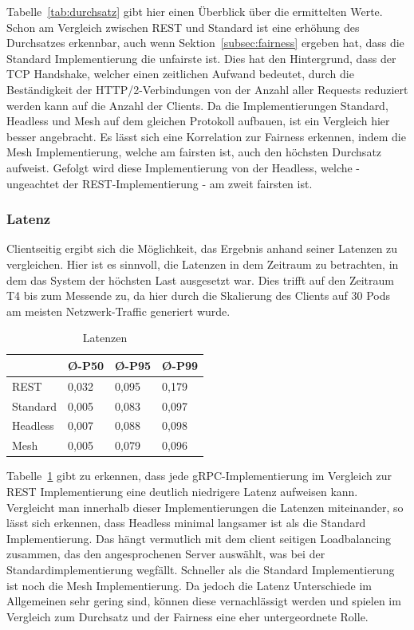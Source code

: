 Tabelle~\ref{tab:durchsatz} gibt hier einen Überblick über die ermittelten Werte.
Schon am Vergleich zwischen REST und Standard ist eine erhöhung des Durchsatzes erkennbar, auch wenn Sektion~\ref{subsec:fairness} ergeben hat, dass die Standard Implementierung die unfairste ist.
Dies hat den Hintergrund, dass der TCP Handshake, welcher einen zeitlichen Aufwand bedeutet, durch die Beständigkeit der HTTP/2-Verbindungen von der Anzahl aller Requests reduziert werden kann auf die Anzahl der Clients.
Da die Implementierungen Standard, Headless und Mesh auf dem gleichen Protokoll aufbauen, ist ein Vergleich hier besser angebracht.
Es lässt sich eine Korrelation zur Fairness erkennen, indem die Mesh Implementierung, welche am fairsten ist, auch den höchsten Durchsatz aufweist.
Gefolgt wird diese Implementierung von der Headless, welche - ungeachtet der REST-Implementierung - am zweit fairsten ist.

\subsubsection{Latenz}
Clientseitig ergibt sich die Möglichkeit, das Ergebnis anhand seiner Latenzen zu vergleichen.
Hier ist es sinnvoll, die Latenzen in dem Zeitraum zu betrachten, in dem das System der höchsten Last ausgesetzt war.
Dies trifft auf den Zeitraum T4 bis zum Messende zu, da hier durch die Skalierung des Clients auf 30 Pods am meisten Netzwerk-Traffic generiert wurde.

\begin{table}[H]
    \centering
    \begin{tabular}{|l|l|l|l|}
        \hline
        & Ø-P50 & Ø-P95 & Ø-P99 \\ \hline
        REST     & 0,032 & 0,095 & 0,179 \\ \hline
        Standard & 0,005 & 0,083 & 0,097 \\ \hline
        Headless & 0,007 & 0,088 & 0,098 \\ \hline
        Mesh     & 0,005 & 0,079 & 0,096 \\ \hline
    \end{tabular}
    \caption{Latenzen}
    \label{tab:latenz}
\end{table}

Tabelle~\ref{tab:latenz} gibt zu erkennen, dass jede gRPC-Implementierung im Vergleich zur REST Implementierung eine deutlich niedrigere Latenz aufweisen kann.
Vergleicht man innerhalb dieser Implementierungen die Latenzen miteinander, so lässt sich erkennen, dass Headless minimal langsamer ist als die Standard Implementierung.
Das hängt vermutlich mit dem client seitigen Loadbalancing zusammen, das den angesprochenen Server auswählt, was bei der Standardimplementierung wegfällt.
Schneller als die Standard Implementierung ist noch die Mesh Implementierung.
Da jedoch die Latenz Unterschiede im Allgemeinen sehr gering sind, können diese vernachlässigt werden und spielen im Vergleich zum Durchsatz und der Fairness eine eher untergeordnete Rolle.

